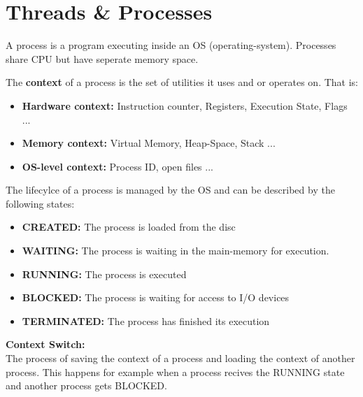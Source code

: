 \section{Threads \& Processes}

\begin{definition}

                A process is a program executing inside an OS (operating-system). Processes share CPU but have seperate
                memory space.
            
\end{definition}

\begin{definition}

                The \textbf{context} of a process is the set of utilities it uses and or operates on. That is:
                \begin{itemize}
    \item \textbf{Hardware context: }Instruction counter, Registers, Execution State, Flags ...
    \item \textbf{Memory context: }Virtual Memory, Heap-Space, Stack ...
    \item \textbf{OS-level context:} Process ID, open files ...
\end{itemize}

\end{definition}

            The lifecylce of a process is managed by the OS and can be described by the following states:
            \begin{itemize}
    \item \textbf{CREATED: }The process is loaded from the disc
    \item \textbf{WAITING: }The process is waiting in the main-memory for execution.
    \item \textbf{RUNNING: }The process is executed
    \item \textbf{BLOCKED: }The process is waiting for access to I/O devices
    \item \textbf{TERMINATED: }The process has finished its execution
\end{itemize}

\begin{definition}

\textbf{Context Switch:}\\

                The process of saving the context of a process and loading the context of another process. This happens
                for example when a process recives the RUNNING state and another process gets BLOCKED.
            
\end{definition}

